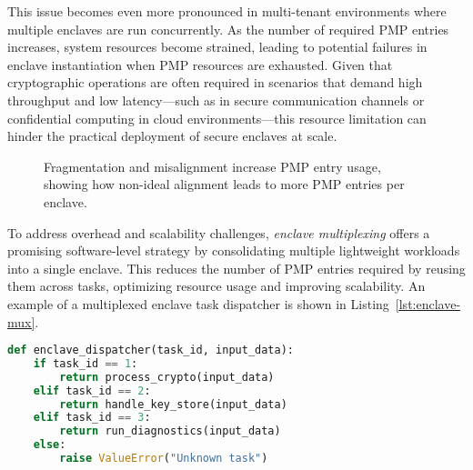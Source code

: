 This issue becomes even more pronounced in multi-tenant environments where multiple enclaves are run concurrently. As the number of required PMP entries increases, system resources become strained, leading to potential failures in enclave instantiation when PMP resources are exhausted. Given that cryptographic operations are often required in scenarios that demand high throughput and low latency—such as in secure communication channels or confidential computing in cloud environments—this resource limitation can hinder the practical deployment of secure enclaves at scale.

\begin{figure}[htbp]
\centering
{}
\caption{Fragmentation and misalignment increase PMP entry usage, showing how non-ideal alignment leads to more PMP entries per enclave.}
\label{fig:pmp-fragmentation-entries}
\end{figure}

To address overhead and scalability challenges, \emph{enclave multiplexing} offers a promising software-level strategy by consolidating multiple lightweight workloads into a single enclave. This reduces the number of PMP entries required by reusing them across tasks, optimizing resource usage and improving scalability. An example of a multiplexed enclave task dispatcher is shown in Listing~\ref{lst:enclave-mux}.

\begin{lstlisting}[language=Python, caption={Multiplexed enclave task dispatcher.}, label={lst:enclave-mux}]
def enclave_dispatcher(task_id, input_data):
    if task_id == 1:
        return process_crypto(input_data)
    elif task_id == 2:
        return handle_key_store(input_data)
    elif task_id == 3:
        return run_diagnostics(input_data)
    else:
        raise ValueError("Unknown task")
\end{lstlisting}

